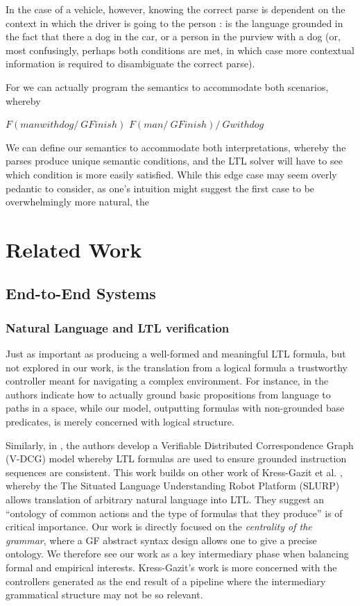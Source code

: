 \documentclass[a4paper, 11pt]{article}
\begin{document}
In the case of a vehicle, however, knowing the correct parse is dependent on
the context in which the driver is going to the person : is the language
grounded in the fact that there a dog in the car, or a person in the purview
with a dog (or, most confusingly, perhaps both conditions are met, in which case
more contextual information is required to disambiguate the correct parse).

For we can actually program the semantics to accommodate both scenarios, whereby

$F (manwithdog /\ G Finish)$
$F (man /\ G Finish) /\ G withdog$

We can define our semantics to accommodate both interpretations, whereby the
parses produce unique semantic conditions, and the LTL solver will have to see
which condition is more easily satisfied. While this edge case may seem overly
pedantic to consider, as one's intuition might suggest the first case to be
overwhelmingly more natural, the


\section{Related Work}

\subsection{End-to-End Systems}

\subsubsection{Natural Language and LTL verification}


Just as important as producing a well-formed and meaningful LTL formula, but not
explored in our work, is the translation from a logical formula a trustworthy
controller meant for navigating a complex environment. For instance, in
\cite{plaku2016motion} the authors indicate how to actually ground basic
propositions from language to paths in a space, while our model, outputting
formulas with non-grounded base predicates, is merely concerned with logical
structure.

Similarly, in \cite{7759412}, the authors develop a Verifiable Distributed
Correspondence Graph (V-DCG) model whereby LTL formulas are used to ensure
grounded instruction sequences are consistent. This work builds on other work of
Kress-Gazit et al. \cite{provCorrectNatControl}, whereby the The Situated
Language Understanding Robot Platform (SLURP) allows translation of arbitrary
natural language into LTL. They suggest an ``ontology of common actions and the
type of formulas that they produce'' is of critical importance. Our work is
directly focused on the \emph{centrality of the grammar}, where a GF abstract
syntax design allows one to give a precise ontology. We therefore see our work as
a key intermediary phase when balancing formal and empirical interests.
Kress-Gazit's work is more concerned with the controllers generated as the end
result of a pipeline where the intermediary grammatical structure may not be so
relevant.
\end{document}
